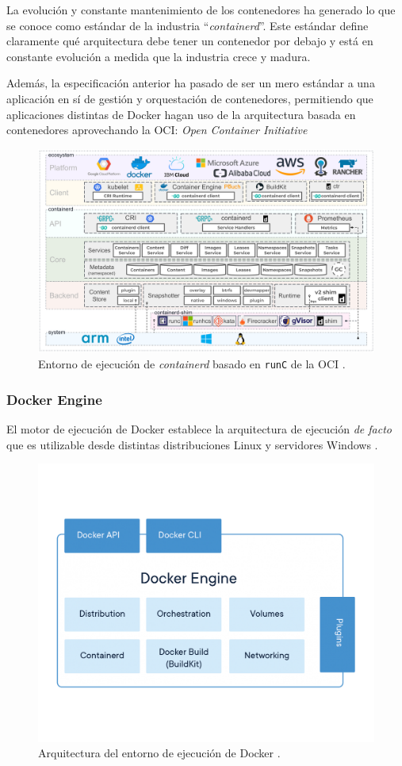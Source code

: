 La evolución y constante mantenimiento de los contenedores ha generado lo que se
conoce como estándar de la industria ``\textit{containerd}''. Este estándar define
claramente qué arquitectura debe tener un contenedor por debajo y está en constante
evolución a medida que la industria crece y madura.

Además, la especificación anterior ha pasado de ser un mero estándar a una aplicación
en sí de gestión y orquestación de contenedores, permitiendo que aplicaciones distintas
de Docker hagan uso de la arquitectura basada en contenedores aprovechando la OCI:
\textit{Open Container Initiative}

\begin{figure}[H]
    \centering
    \includegraphics[width=.7\linewidth]{pictures/containerd-arch.png}
    \caption{Entorno de ejecución de \textit{containerd} basado en \texttt{runC} de la OCI \cite{Containerd}.}
    \label{fig:containerd-arch}
\end{figure}

\subsubsection*{Docker Engine}
El motor de ejecución de Docker establece la arquitectura de ejecución \textit{de facto}
que es utilizable desde distintas distribuciones Linux y servidores Windows \cite{ContainerRuntimeDocker}.

\begin{figure}[H]
    \centering
    \includegraphics[width=.7\linewidth]{pictures/docker-engine.png}
    \caption{Arquitectura del entorno de ejecución de Docker \cite{ContainerRuntimeDocker}.}
    \label{fig:docker-engine}
\end{figure}

